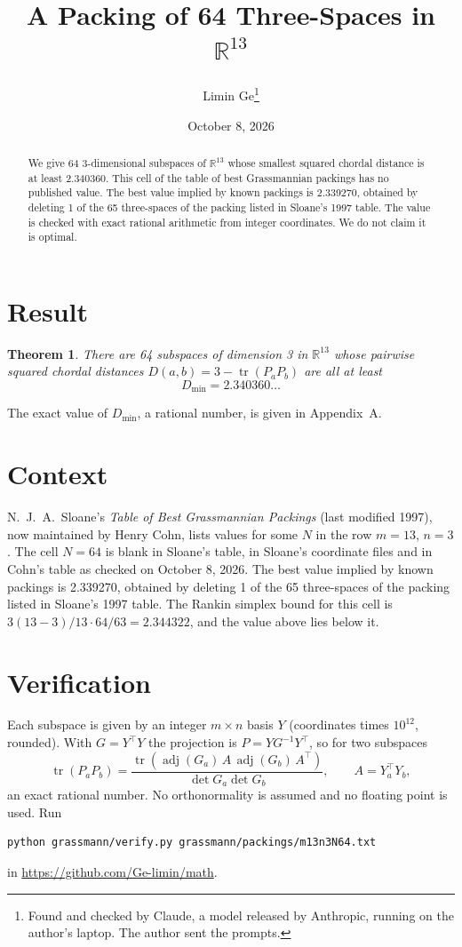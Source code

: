 \documentclass[11pt,a4paper]{article}
\title{A Packing of 64 Three-Spaces in $\mathbb{R}^{13}$}
\author{Limin Ge\thanks{Found and checked by Claude, a model released by Anthropic, running on the author's laptop. The author sent the prompts.}}
\date{October 8, 2026}
\newtheorem*{theorem}{Theorem}
\begin{document}
\maketitle
\begin{abstract}
We give 64 3-dimensional subspaces of $\mathbb{R}^{13}$ whose smallest squared chordal distance is at least 2.340360. This cell of the table of best Grassmannian packings has no published value. The best value implied by known packings is 2.339270, obtained by deleting 1 of the 65 three-spaces of the packing listed in Sloane's 1997 table. The value is checked with exact rational arithmetic from integer coordinates. We do not claim it is optimal.
\end{abstract}

\section{Result}
\begin{theorem}
There are 64 subspaces of dimension 3 in $\mathbb{R}^{13}$ whose pairwise squared chordal distances $D(a,b) = 3 - \operatorname{tr}(P_aP_b)$ are all at least
\[ D_{\min} = 2.340360\ldots \]
\end{theorem}
The exact value of $D_{\min}$, a rational number, is given in Appendix~A.


\section{Context}
N.~J.~A.~Sloane's \emph{Table of Best Grassmannian Packings} (last modified 1997), now maintained by Henry Cohn, lists values for some $N$ in the row $m=13$, $n=3$. The cell $N=64$ is blank in Sloane's table, in Sloane's coordinate files and in Cohn's table as checked on October 8, 2026. The best value implied by known packings is 2.339270, obtained by deleting 1 of the 65 three-spaces of the packing listed in Sloane's 1997 table. The Rankin simplex bound for this cell is $3(13-3)/13\cdot 64/63 = 2.344322$, and the value above lies below it.


\section{Verification}
Each subspace is given by an integer $m\times n$ basis $Y$ (coordinates times $10^{12}$, rounded). With $G=Y^\top Y$ the projection is $P=YG^{-1}Y^\top$, so for two subspaces
\[ \operatorname{tr}(P_aP_b)=\frac{\operatorname{tr}(\operatorname{adj}(G_a)\,A\,\operatorname{adj}(G_b)\,A^\top)}{\det G_a\det G_b},\qquad A=Y_a^\top Y_b, \]
an exact rational number. No orthonormality is assumed and no floating point is used. Run
\begin{verbatim}
python grassmann/verify.py grassmann/packings/m13n3N64.txt
\end{verbatim}
in \url{https://github.com/Ge-limin/math}.
\end{document}
